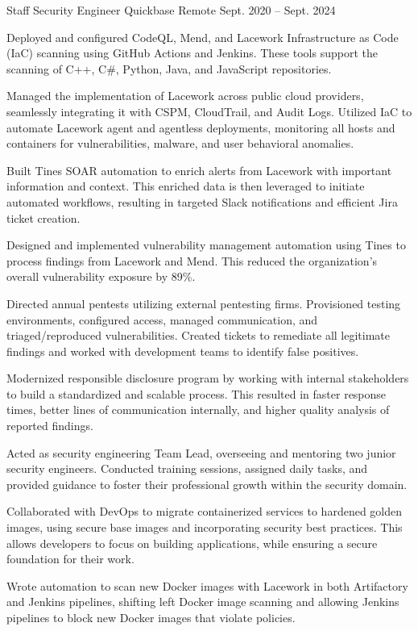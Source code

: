 \begin{cventries}
  \cventry
    {Staff Security Engineer} %
    {Quickbase} %
    {Remote} %
    {Sept. 2020 – Sept. 2024} %
    {
      \begin{cvitems} %
        \item {
          Deployed and configured CodeQL, Mend, and Lacework Infrastructure as Code (IaC) scanning using GitHub Actions and Jenkins. These tools support the scanning of C++, C\#, Python, Java, and JavaScript repositories.
        }
        \item {
          Managed the implementation of Lacework across public cloud providers, seamlessly integrating it with CSPM, CloudTrail, and Audit Logs. Utilized IaC to automate Lacework agent and agentless deployments, monitoring all hosts and containers for vulnerabilities, malware, and user behavioral anomalies.
        }
        \item {
          Built Tines SOAR automation to enrich alerts from Lacework with important information and context. This enriched data is then leveraged to initiate automated workflows, resulting in targeted Slack notifications and efficient Jira ticket creation.
        }
        \item {
          Designed and implemented vulnerability management automation using Tines to process findings from Lacework and Mend. This reduced the organization's overall vulnerability exposure by 89\%.
        }
        \item {
          Directed annual pentests utilizing external pentesting firms. Provisioned testing environments, configured access, managed communication, and triaged/reproduced vulnerabilities. Created tickets to remediate all legitimate findings and worked with development teams to identify false positives.
        }
        \item {
          Modernized responsible disclosure program by working with internal stakeholders to build a standardized and scalable process. This resulted in faster response times, better lines of communication internally, and higher quality analysis of reported findings.
        }
        \item {
          Acted as security engineering Team Lead, overseeing and mentoring two junior security engineers. Conducted training sessions, assigned daily tasks, and provided guidance to foster their professional growth within the security domain.
        }
        \item {
          Collaborated with DevOps to migrate containerized services to hardened golden images, using secure base images and incorporating security best practices. This allows developers to focus on building applications, while ensuring a secure foundation for their work.
        }
        \item {
          Wrote automation to scan new Docker images with Lacework in both Artifactory and Jenkins pipelines, shifting left Docker image scanning and allowing Jenkins pipelines to block new Docker images that violate policies.
        }
      \end{cvitems}
    }


\end{cventries}
